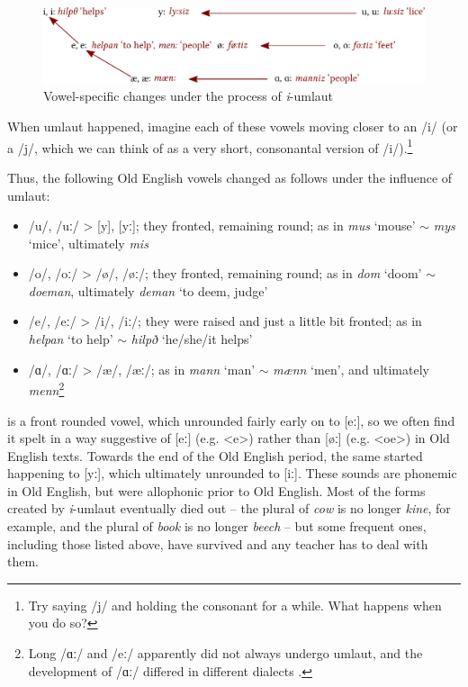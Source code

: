 \begin{figure}
    \includegraphics[width=\textwidth]{chapters/img/umlaut_mod.pdf}
    \caption{Vowel-specific changes under the process of \emph{i}-umlaut}
    \label{fig:umlaut}
\end{figure}

When umlaut happened, imagine each of these vowels moving closer to an /i/ (or a /j/, which we can think of as a very short, consonantal version of /i/).\footnote{Try saying /j/ and holding the consonant for a while. What happens when you do so?}

Thus, the following Old English vowels changed as follows under the influence of umlaut:
\begin{itemize}
\item /u/, /uː/ > [y], [yː]; they fronted, remaining round; as in \textit{mus} `mouse' $\sim$ \textit{mys} `mice', ultimately \textit{mis}
\item /o/, /oː/ > /ø/, /øː/; they fronted, remaining round; as in \textit{dom} `doom' $\sim$ \textit{doeman}, ultimately \textit{deman} `to deem, judge'
\item /e/, /eː/ > /i/, /iː/; they were raised and just a little bit fronted; as in \textit{helpan} `to help' $\sim$ \textit{hilpð} `he/she/it helps'
\item /ɑ/, /ɑː/ > /æ/, /æː/; as in \textit{mann} `man' $\sim$ \textit{mænn} `men', and ultimately \textit{menn}\footnote{Long /ɑː/ and /eː/ apparently did not always undergo umlaut, and the development of /ɑː/ differed in different dialects \citep[159--160]{Minkova2014}.}
\end{itemize}

\noindent [øː] is a front rounded vowel, which unrounded fairly early on to [eː], so we often find it spelt in a way suggestive of [eː] (e.g. <e>) rather than [øː] (e.g. <oe>) in Old English texts. Towards the end of the Old English period, the same started happening to [yː], which ultimately unrounded to [iː]. These sounds are phonemic in Old English, but were allophonic prior to Old English. Most of the forms created by \emph{i}-umlaut eventually died out -- the plural of \emph{cow} is no longer \emph{kine}, for example, and the plural of \emph{book} is no longer \emph{beech} -- but some frequent ones, including those listed above, have survived and any teacher has to deal with them.

